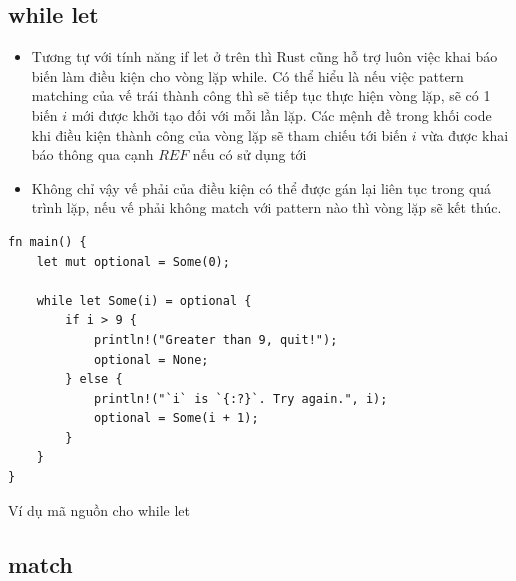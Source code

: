 \subsection{while let}

\begin{itemize}
    \item Tương tự với tính năng if let ở trên thì Rust cũng hỗ trợ luôn việc khai báo biến làm điều kiện cho vòng lặp while. Có thể hiểu là nếu việc pattern matching của vế trái thành công thì sẽ tiếp tục thực hiện vòng lặp, sẽ có 1 biến $i$ mới được khởi tạo đối với mỗi lần lặp. Các mệnh đề trong khối code khi điều kiện thành công của vòng lặp sẽ tham chiếu tới biến $i$ vừa được khai báo thông qua cạnh $REF$ nếu có sử dụng tới
    \item Không chỉ vậy vế phải của điều kiện có thể được gán lại liên tục trong quá trình lặp, nếu vế phải không match với pattern nào thì vòng lặp sẽ kết thúc.
\end{itemize}

\begin{listing}[H]
\begin{verbatim}
fn main() {
    let mut optional = Some(0);

    while let Some(i) = optional {
        if i > 9 {
            println!("Greater than 9, quit!");
            optional = None;
        } else {
            println!("`i` is `{:?}`. Try again.", i);
            optional = Some(i + 1);
        }
    }
}
\end{verbatim}
\caption{Ví dụ mã nguồn cho while let}
\label{code:c3_fn}
\end{listing}

\subsection{match}

